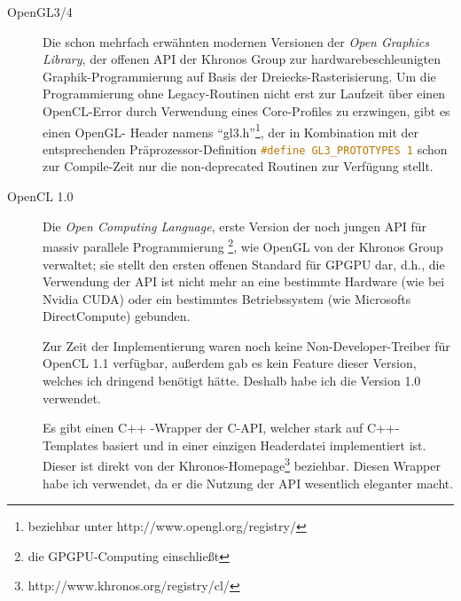 	\begin{description}
		\item[OpenGL3/4]
		Die schon mehrfach erwähnten modernen Versionen der \linebreak \emph{Open Graphics Library},
		der offenen API der Khronos Group zur \linebreak hardwarebeschleunigten Graphik-Programmierung 
		auf Basis der Dreiecks-Rasterisierung.
		Um die Programmierung ohne Legacy-Routinen nicht erst zur Laufzeit über einen OpenCL-Error
		durch Verwendung eines Core-Profiles zu erzwingen, gibt es einen OpenGL- Header
		namens "`gl3.h"'\footnote{beziehbar unter http://www.opengl.org/registry/},
		der in Kombination mit der entsprechenden Präprozessor-Definition
		\lstinline[language=C]|#define GL3_PROTOTYPES 1| schon zur Compile-Zeit nur die non-deprecated
		Routinen zur Verfügung stellt.
		
     	\item[OpenCL 1.0]
	    Die \emph{Open Computing Language}, erste Version der noch jungen API für massiv parallele Programmierung
	    \footnote{die GPGPU-Computing einschließt}, wie OpenGL von der Khronos Group verwaltet; 
	    sie stellt den ersten offenen Standard für GPGPU dar, d.h., die Verwendung der API ist nicht mehr an eine
	    bestimmte Hardware (wie bei Nvidia CUDA) oder ein bestimmtes Betriebssystem (wie Microsofts DirectCompute)
	    gebunden.
	    
	    Zur Zeit der Implementierung waren noch keine Non-Developer-Treiber für OpenCL 1.1 verfügbar, 
	    außerdem gab es kein Feature dieser Version, welches ich dringend benötigt hätte.
	    Deshalb habe ich die Version 1.0 verwendet.
	    
	    Es gibt einen C++ -Wrapper der C-API, welcher stark auf C++-Templates basiert und in einer einzigen Headerdatei 
	    implementiert ist. Dieser ist direkt von der Khronos-Homepage\footnote{http://www.khronos.org/registry/cl/} 	
	    beziehbar. Diesen Wrapper habe ich verwendet, da er die Nutzung der API wesentlich eleganter macht.
	    

\end{description}
